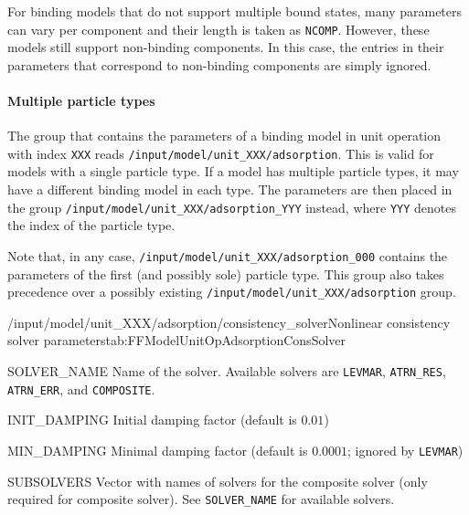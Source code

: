 For binding models that do not support multiple bound states, many parameters can vary per component and their length is taken as \texttt{NCOMP}.
However, these models still support non-binding components.
In this case, the entries in their parameters that correspond to non-binding components are simply ignored.

\paragraph{Multiple particle types}

The group that contains the parameters of a binding model in unit operation with index \texttt{XXX} reads \texttt{/input/model/unit\_XXX/adsorption}.
This is valid for models with a single particle type.
If a model has multiple particle types, it may have a different binding model in each type.
The parameters are then placed in the group \texttt{/input/model/unit\_XXX/adsorption\_YYY} instead, where \texttt{YYY} denotes the index of the particle type.

Note that, in any case, \texttt{/input/model/unit\_XXX/adsorption\_000} contains the parameters of the first (and possibly sole) particle type.
This group also takes precedence over a possibly existing \texttt{/input/model/unit\_XXX/adsorption} group.

\begin{subgroup}{/input/model/unit\_XXX/adsorption/consistency\_solver}{Nonlinear consistency solver parameters}{tab:FFModelUnitOpAdsorptionConsSolver}
  \begin{dataset}[type=string,length=1]{SOLVER\_NAME}
    Name of the solver.
    Available solvers are \texttt{LEVMAR}, \texttt{ATRN\_RES}, \texttt{ATRN\_ERR}, and \texttt{COMPOSITE}.
  \end{dataset}
  \begin{dataset}[type=double,range={$\geq 0$},length=1]{INIT\_DAMPING}
    Initial damping factor (default is $0.01$)
  \end{dataset}
  \begin{dataset}[type=double,range={$\geq 0$},length=1]{MIN\_DAMPING}
    Minimal damping factor (default is $0.0001$; ignored by \texttt{LEVMAR})
  \end{dataset}
  \begin{dataset}[type=string,length={$> 1$}]{SUBSOLVERS}
    Vector with names of solvers for the composite solver (only required for composite solver).
    See \texttt{SOLVER\_NAME} for available solvers.
  \end{dataset}
\end{subgroup}

